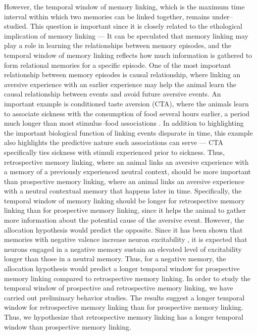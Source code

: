 \documentclass[master.tex]{subfiles}
\begin{document}
However, the temporal window of memory linking, which is the maximum time
interval within which two memories can be linked together, remains
under--studied. This question is important since it is closely related to the
ethological implication of memory linking --- It can be speculated that memory
linking may play a role in learning the relationships between memory episodes,
and the temporal window of memory linking reflects how much information is
gathered to form relational memories for a specific episode. One of the most
important relationship between memory episodes is causal relationship, where
linking an aversive experience with an earlier experience may help the animal
learn the causal relationship between events and avoid future aversive events.
An important example is conditioned taste aversion (CTA), where the animals
learn to associate sickness with the consumption of food several hours earlier,
a period much longer than most stimulus--food associations
\cite{garcia_conditioned_1955}. In addition to highlighting the important
biological function of linking events disparate in time, this example also
highlights the predictive nature such associations can serve --- CTA
specifically ties sickness with stimuli experienced prior to sickness. Thus,
retrospective memory linking, where an animal links an aversive experience with
a memory of a previously experienced neutral context, should be more
important than prospective memory linking, where an animal links an aversive
experience with a neutral contextual memory that happens later in time.
Specifically, the temporal window of memory linking should be longer for
retrospective memory linking than for prospective memory linking, since it helps
the animal to gather more information about the potential cause of the aversive
event. However, the allocation hypothesis would predict the opposite. Since it
has been shown that memories with negative valence increase neuron excitability
\cite{mckay_intrinsic_2009, rashid_competition_2016}, it is expected that
neurons engaged in a negative memory sustain an elevated level of excitability
longer than those in a neutral memory. Thus, for a negative memory, the
allocation hypothesis would predict a longer temporal window for prospective
memory linking compared to retrospective memory linking. In order to study the
temporal window of prospective and retrospective memory linking, we have carried
out preliminary behavior studies. The results suggest a longer temporal window
for retrospective memory linking than for prospective memory linking. Thus, we
hypothesize that retrospective memory linking has a longer temporal window than
prospective memory linking.
\end{document}
